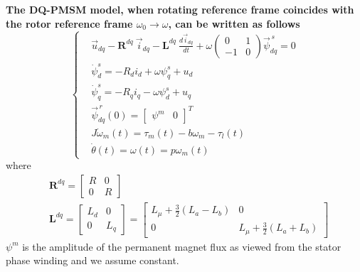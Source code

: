 \documentclass[11pt,a4paper]{article}
\numberwithin{equation}{section}
\theoremstyle{it}
\theoremstyle{definition}
\begin{document}
\begin{onehalfspace}
\begin{mybox}
	\textbf{The DQ-PMSM model, when rotating reference frame coincides with the rotor reference frame $\omega_0 \rightarrow \omega$, can be written as follows}
	\begin{equation}\label{twophase_eq2}
		\left\lbrace \begin{aligned}
			& \vec{u}_{dq}-\mathbf{R}^{dq}\ \vec{i}_{dq} - \mathbf{L}^{dq}\ \frac{d\vec{i}_{dq}}{dt} + \omega\begin{pmatrix} 0 & 1\\-1 & 0 \end{pmatrix}\vec{\psi}_{dq}^{\,s} = 0\\[6pt]
			&\dot{\psi}_d^s = -R_d i_d + \omega  \psi_q^s + u_d \\[6pt]
			&\dot{\psi}_q^s = -R_q i_q - \omega\psi_d^s + u_q \\[6pt]
			& \vec{\psi}^{\,r}_{dq}(0) = \begin{bmatrix} \psi^m &  0 \end{bmatrix}^T \\[6pt]
			& J\dot{\omega}_m(t) = \tau_m(t)-b{\omega}_m-\tau_l(t) \\[6pt]
			& \dot{\theta}(t) = \omega(t) = p\omega_m(t) 
		\end{aligned} \right. 
	\end{equation}
	where
	\begin{equation*}
		\begin{aligned}
			& \mathbf{R}^{dq} = 
			\begin{bmatrix} R &  0 \\
				0 & R
			\end{bmatrix} \\[6pt]
			& \mathbf{L}^{dq} = 
			\begin{bmatrix} L_d &  0 \\
				0 & L_q
			\end{bmatrix} =
			\begin{bmatrix} L_\mu+\frac{3}{2}(L_a-L_b) &  0 \\
				0 & L_\mu+\frac{3}{2}(L_a+L_b)
			\end{bmatrix}
		\end{aligned} 
	\end{equation*}
	$\psi^m$ is the amplitude of the permanent magnet flux as viewed from the stator phase winding and we assume constant.
\end{mybox}


\end{onehalfspace}
\end{document}
